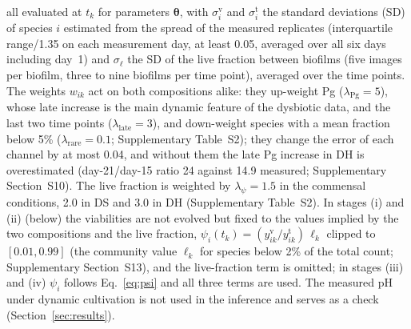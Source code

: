 \documentclass[preprint,12pt]{elsarticle}
\newcommand{\btheta}{\boldsymbol{\theta}}
\begin{document}
all evaluated at $t_k$ for parameters $\btheta$, with $\sigma^{\mathrm{v}}_{i}$ and $\sigma^{\mathrm{t}}_{i}$ the standard deviations (SD) of species $i$ estimated from the spread of the measured replicates (interquartile range/1.35 on each measurement day, at least 0.05, averaged over all six days including day~1) and $\sigma_\ell$ the SD of the live fraction between biofilms (five images per biofilm, three to nine biofilms per time point), averaged over the time points.
The weights $w_{ik}$ act on both compositions alike: they up-weight Pg ($\lambda_{\mathrm{Pg}}=5$), whose late increase is the main dynamic feature of the dysbiotic data, and the last two time points ($\lambda_{\mathrm{late}}=3$), and down-weight species with a mean fraction below 5\% ($\lambda_{\mathrm{rare}}=0.1$; Supplementary Table~S2); they change the error of each channel by at most 0.04, and without them the late Pg increase in DH is overestimated (day-21/day-15 ratio 24 against 14.9 measured; Supplementary Section~S10).
The live fraction is weighted by $\lambda_\psi=1.5$ in the commensal conditions, 2.0 in DS and 3.0 in DH (Supplementary Table~S2).
In stages (i) and (ii) (below) the viabilities are not evolved but fixed to the values implied by the two compositions and the live fraction, $\psi_i(t_k)=(y^{\mathrm{v}}_{ik}/y^{\mathrm{t}}_{ik})\,\ell_k$ clipped to $[0.01,0.99]$ (the community value $\ell_k$ for species below 2\% of the total count; Supplementary Section~S13), and the live-fraction term is omitted; in stages (iii) and (iv) $\psi_i$ follows Eq.~\eqref{eq:psi} and all three terms are used.
The measured pH under dynamic cultivation is not used in the inference and serves as a check (Section~\ref{sec:results}).
\end{document}
